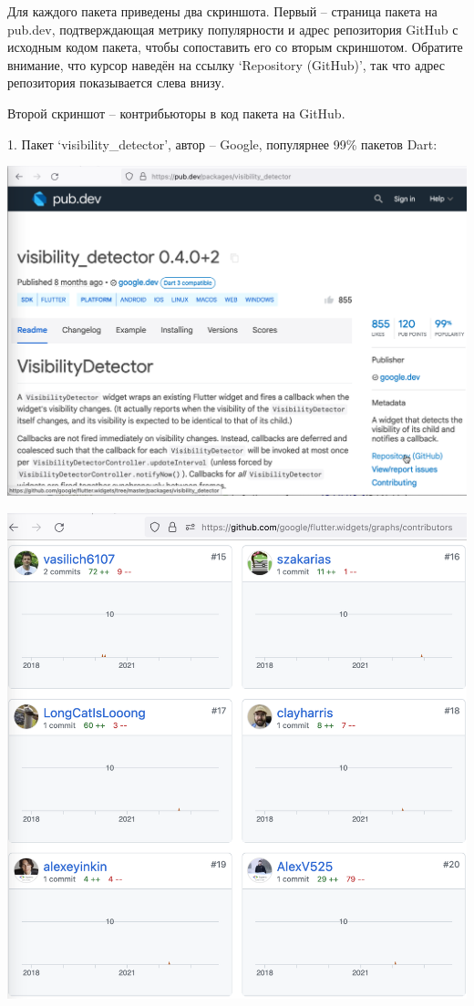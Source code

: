 
Для каждого пакета приведены два скриншота.
Первый -- страница пакета на pub.dev, подтверждающая метрику популярности
и адрес репозитория GitHub с исходным кодом пакета,
чтобы сопоставить его со вторым скриншотом.
Обратите внимание, что курсор наведён на ссылку `Repository (GitHub)',
так что адрес репозитория показывается слева внизу.

Второй скриншот -- контрибьюторы в код пакета на GitHub.

1. Пакет `visibility\_detector', автор -- Google, популярнее 99\% пакетов Dart:

\includegraphics[width=\textwidth]{visibility_detector}
\pagebreak

\includegraphics[width=\textwidth]{visibility_detector_contributors}
\pagebreak

